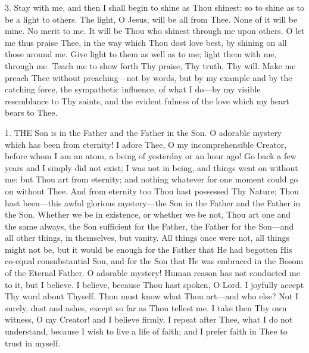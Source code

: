 3. Stay with me, and then I
shall begin to shine as Thou shinest: so to shine as to be a light to
others. The light, O Jesus, will be all from Thee. None of it will be
mine. No merit to me. It will be Thou who shinest through me upon
others. O let me thus praise Thee, in the way which Thou dost love best,
by shining on all those around me. Give light to them as well as to me;
light them with me, through me. Teach me to show forth Thy praise, Thy
truth, Thy will. Make me preach Thee without preaching—not by words,
but by my example and by the catching force, the sympathetic influence,
of what I do—by my visible resemblance to Thy saints, and the evident
fulness of the love which my heart bears to Thee.




1. THE
Son is in the Father and the Father in the Son. O adorable mystery which
has been from eternity! I adore Thee, O my incomprehensible Creator,
before whom I am an atom, a being of yesterday or an hour ago! Go back a
few years and I simply did not exist; I was not in being, and things
went on without me: but Thou art from eternity; and nothing whatever for
one moment could go on without Thee. And from eternity too Thou hast
possessed Thy Nature; Thou hast been—this awful glorious mystery—the
Son in the Father and the Father in the Son. Whether we be in existence,
or whether we be not, Thou art one and the same always, the Son
sufficient for the Father, the Father for the Son—and all other
things, in themselves, but vanity. All things once were not, all things
might not be, but it would be enough for the Father that He had begotten
His co-equal consubstantial Son, and for the Son that He was embraced
in the Bosom of the Eternal Father. O adorable mystery! Human
reason has not conducted me to it, but I believe. I believe, because
Thou hast spoken, O Lord. I joyfully accept Thy word about Thyself. Thou
must know what Thou art—and who else? Not I surely, dust and ashes,
except so far as Thou tellest me. I take then Thy own witness, O my
Creator! and I believe firmly, I repeat after Thee, what I do not
understand, because I wish to live a life of faith; and I prefer faith
in Thee to trust in myself.

